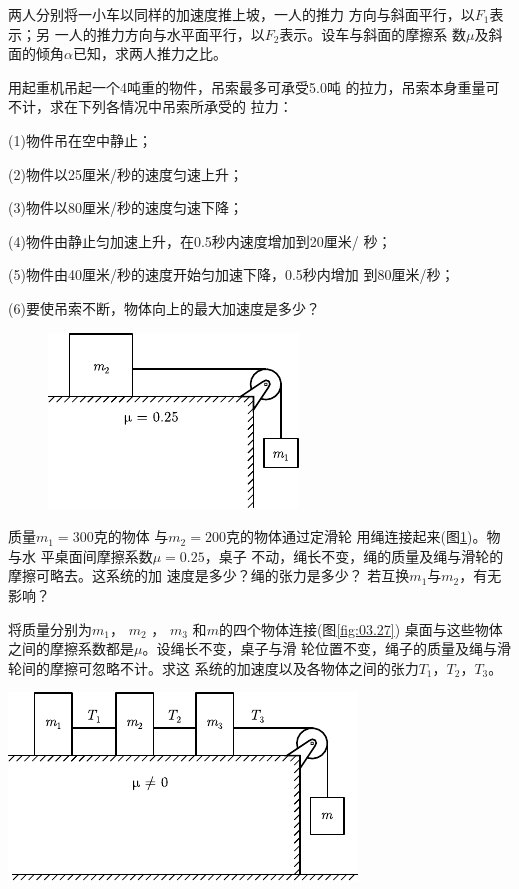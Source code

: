 \begin{exercises}
\exercise 两人分别将一小车以同样的加速度推上坡，一人的推力
方向与斜面平行，以$ F_1 $表示；另
一人的推力方向与水平面平行，以$  F_2  $表示。设车与斜面的摩擦系
数$ \mu $及斜面的倾角$ \alpha $已知，求两人推力之比。

\exercise 用起重机吊起一个4吨重的物件，吊索最多可承受5.0吨
的拉力，吊索本身重量可不计，求在下列各情况中吊索所承受的
拉力：

(1)物件吊在空中静止；

(2)物件以25厘米/秒的速度匀速上升；

(3)物件以80厘米/秒的速度匀速下降；

(4)物件由静止匀加速上升，在0.5秒内速度增加到20厘米/
秒；

(5)物件由40厘米/秒的速度开始匀加速下降，0.5秒内增加
到80厘米/秒；

(6)要使吊索不断，物体向上的最大加速度是多少？

\begin{figure}
	\centering
	\includegraphics{figure/fig03.26}
	\caption{}
	\label{fig:03.26}
\end{figure}
\exercise 质量$  m _ { 1 } = 3 0 0  $克的物体
与$  m _ { 2 } = 2 0 0  $克的物体通过定滑轮
用绳连接起来(图\ref{fig:03.26})。物与水
平桌面间摩擦系数$  \mu = 0 . 2 5  $，桌子
不动，绳长不变，绳的质量及绳与滑轮的摩擦可略去。这系统的加
速度是多少？绳的张力是多少？
若互换$ m_1 $与$ m_2 $，有无影响？

\exercise 将质量分别为$ m_1 $， $ m _ { 2 } $ ， $m _ { 3 }$ 和$ m $的四个物体连接(图\ref{fig:03.27})
桌面与这些物体之间的摩擦系数都是$ \mu $。设绳长不变，桌子与滑
轮位置不变，绳子的质量及绳与滑轮间的摩擦可忽略不计。求这
系统的加速度以及各物体之间的张力$  T _ { 1 }  $，$  T _ { 2 }  $，$  T _ { 3 }  $。
\begin{figurex}
	\centering
	\includegraphics{figure/fig03.27}
	\caption{}
	\label{fig:03.27}
\end{figurex}


\end{exercises}
